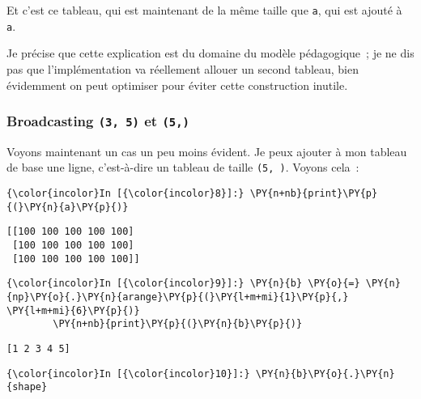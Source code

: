Et c'est ce tableau, qui est maintenant de la même taille que
\texttt{a}, qui est ajouté à \texttt{a}.

    Je précise que cette explication est du domaine du modèle pédagogique~;
je ne dis pas que l'implémentation va réellement allouer un second
tableau, bien évidemment on peut optimiser pour éviter cette
construction inutile.

    \hypertarget{broadcasting-3-5-et-5}{%
\subsubsection{\texorpdfstring{Broadcasting \texttt{(3,\ 5)} et
\texttt{(5,)}}{Broadcasting (3, 5) et (5,)}}\label{broadcasting-3-5-et-5}}

    Voyons maintenant un cas un peu moins évident. Je peux ajouter à mon
tableau de base une ligne, c'est-à-dire un tableau de taille
\texttt{(5,\ )}. Voyons cela~:

    \begin{Verbatim}[commandchars=\\\{\}]
{\color{incolor}In [{\color{incolor}8}]:} \PY{n+nb}{print}\PY{p}{(}\PY{n}{a}\PY{p}{)}
\end{Verbatim}


    \begin{Verbatim}[commandchars=\\\{\}]
[[100 100 100 100 100]
 [100 100 100 100 100]
 [100 100 100 100 100]]

    \end{Verbatim}

    \begin{Verbatim}[commandchars=\\\{\}]
{\color{incolor}In [{\color{incolor}9}]:} \PY{n}{b} \PY{o}{=} \PY{n}{np}\PY{o}{.}\PY{n}{arange}\PY{p}{(}\PY{l+m+mi}{1}\PY{p}{,} \PY{l+m+mi}{6}\PY{p}{)}
        \PY{n+nb}{print}\PY{p}{(}\PY{n}{b}\PY{p}{)}
\end{Verbatim}


    \begin{Verbatim}[commandchars=\\\{\}]
[1 2 3 4 5]

    \end{Verbatim}

    \begin{Verbatim}[commandchars=\\\{\}]
{\color{incolor}In [{\color{incolor}10}]:} \PY{n}{b}\PY{o}{.}\PY{n}{shape}
\end{Verbatim}


